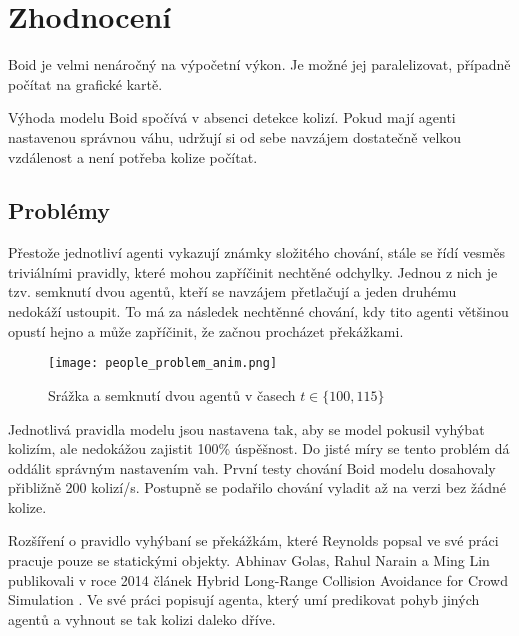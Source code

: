 \section{Zhodnocení}
Boid je velmi nenáročný na výpočetní výkon. Je možné jej paralelizovat, případně počítat na grafické kartě. 
\par
Výhoda modelu Boid spočívá v absenci detekce kolizí. Pokud mají agenti nastavenou správnou váhu, udržují si od sebe navzájem dostatečně velkou vzdálenost a není potřeba kolize počítat. 

\subsection{Problémy}
Přestože jednotliví agenti vykazují známky složitého chování, stále se řídí vesměs triviálními pravidly, které mohou zapříčinit nechtěné odchylky. Jednou z nich je tzv. semknutí dvou agentů, kteří se navzájem přetlačují a jeden druhému nedokáží ustoupit. To má za následek nechtěnné chování, kdy tito agenti většinou opustí hejno a může zapříčinit, že začnou procházet překážkami. 
\begin{figure}[H]
	\texttt{[image: people\_problem\_anim.png]}
	\centering
	\caption{Srážka a semknutí dvou agentů v časech $t\in\{ 100, 115\} $}
\end{figure}
Jednotlivá pravidla modelu jsou nastavena tak, aby se model pokusil vyhýbat kolizím, ale nedokážou zajistit 100\% úspěšnost. Do jisté míry se tento problém dá oddálit správným nastavením vah. První testy chování Boid modelu dosahovaly přibližně 200 kolizí/s. Postupně se podařilo chování vyladit až na verzi bez žádné kolize. 
\par
Rozšíření o pravidlo vyhýbaní se překážkám, které Reynolds popsal ve své práci \cite{ReynoldsBoidNoBump} pracuje pouze se statickými objekty. Abhinav Golas, Rahul Narain a Ming Lin publikovali v roce 2014 článek Hybrid Long-Range Collision Avoidance for Crowd Simulation \cite{Golas2013}. Ve své práci popisují agenta, který umí predikovat pohyb jiných agentů a vyhnout se tak kolizi daleko dříve. 